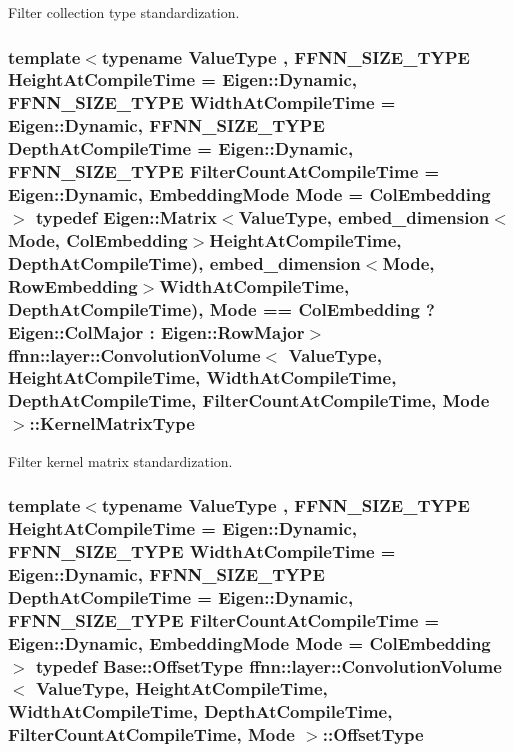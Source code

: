Filter collection type standardization. 

\hypertarget{classffnn_1_1layer_1_1_convolution_volume_ad928a402aa7aa7e5fb3cd5b7f088f73e}{
\subsubsection[{Kernel\-Matrix\-Type}]{\setlength{\rightskip}{0pt plus 5cm}template$<$typename Value\-Type , F\-F\-N\-N\-\_\-\-S\-I\-Z\-E\-\_\-\-T\-Y\-P\-E Height\-At\-Compile\-Time = Eigen\-::\-Dynamic, F\-F\-N\-N\-\_\-\-S\-I\-Z\-E\-\_\-\-T\-Y\-P\-E Width\-At\-Compile\-Time = Eigen\-::\-Dynamic, F\-F\-N\-N\-\_\-\-S\-I\-Z\-E\-\_\-\-T\-Y\-P\-E Depth\-At\-Compile\-Time = Eigen\-::\-Dynamic, F\-F\-N\-N\-\_\-\-S\-I\-Z\-E\-\_\-\-T\-Y\-P\-E Filter\-Count\-At\-Compile\-Time = Eigen\-::\-Dynamic, Embedding\-Mode Mode = Col\-Embedding$>$ typedef Eigen\-::\-Matrix$<$Value\-Type, {\bf embed\-\_\-dimension}$<$Mode, {\bf Col\-Embedding}$>$Height\-At\-Compile\-Time, Depth\-At\-Compile\-Time), {\bf embed\-\_\-dimension}$<$Mode, {\bf Row\-Embedding}$>$Width\-At\-Compile\-Time, Depth\-At\-Compile\-Time), Mode == {\bf Col\-Embedding} ? Eigen\-::\-Col\-Major \-: Eigen\-::\-Row\-Major$>$ {\bf ffnn\-::layer\-::\-Convolution\-Volume}$<$ Value\-Type, Height\-At\-Compile\-Time, Width\-At\-Compile\-Time, Depth\-At\-Compile\-Time, Filter\-Count\-At\-Compile\-Time, Mode $>$\-::{\bf Kernel\-Matrix\-Type}}}\label{classffnn_1_1layer_1_1_convolution_volume_ad928a402aa7aa7e5fb3cd5b7f088f73e}


Filter kernel matrix standardization. 

\hypertarget{classffnn_1_1layer_1_1_convolution_volume_a17bdd4d0402730cbc4cd491cb8c3bdfd}{
\subsubsection[{Offset\-Type}]{\setlength{\rightskip}{0pt plus 5cm}template$<$typename Value\-Type , F\-F\-N\-N\-\_\-\-S\-I\-Z\-E\-\_\-\-T\-Y\-P\-E Height\-At\-Compile\-Time = Eigen\-::\-Dynamic, F\-F\-N\-N\-\_\-\-S\-I\-Z\-E\-\_\-\-T\-Y\-P\-E Width\-At\-Compile\-Time = Eigen\-::\-Dynamic, F\-F\-N\-N\-\_\-\-S\-I\-Z\-E\-\_\-\-T\-Y\-P\-E Depth\-At\-Compile\-Time = Eigen\-::\-Dynamic, F\-F\-N\-N\-\_\-\-S\-I\-Z\-E\-\_\-\-T\-Y\-P\-E Filter\-Count\-At\-Compile\-Time = Eigen\-::\-Dynamic, Embedding\-Mode Mode = Col\-Embedding$>$ typedef {\bf Base\-::\-Offset\-Type} {\bf ffnn\-::layer\-::\-Convolution\-Volume}$<$ Value\-Type, Height\-At\-Compile\-Time, Width\-At\-Compile\-Time, Depth\-At\-Compile\-Time, Filter\-Count\-At\-Compile\-Time, Mode $>$\-::{\bf Offset\-Type}}}\label{classffnn_1_1layer_1_1_convolution_volume_a17bdd4d0402730cbc4cd491cb8c3bdfd}


